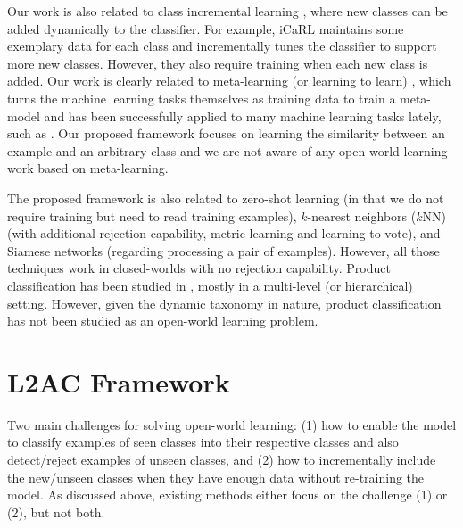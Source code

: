 Our work is also related to class incremental learning \cite{rebuffi2017icarl,rusu2016progressive,lee2017lifelong}, where new classes can be added dynamically to the classifier. For example, 
iCaRL \cite{rebuffi2017icarl} maintains some exemplary data for each class and incrementally tunes the classifier to support more new classes. However, they also require training when each new class is added. 
Our work is clearly related to meta-learning (or learning to learn) \cite{thrun2012learning}, 
which turns the machine learning tasks themselves as training data to train a meta-model and has been successfully applied to many machine learning tasks lately, such as 
\cite{andrychowicz2016learning,fernando2017pathnet,finn2017model,finn2018probabilistic,fan2018learning}.
Our proposed framework focuses on learning the similarity between an example and an arbitrary class
and we are not aware of any open-world learning work based on meta-learning. 

The proposed framework is also related to zero-shot learning \cite{lampert2009learning,palatucci2009zero,socher2013zero} (in that we do not require training but need to read training examples), 
$k$-nearest neighbors ($k$NN) (with additional rejection capability, metric learning \cite{xing2003distance} and learning to vote), 
and Siamese networks \cite{bromley1994signature,koch2015siamese,vinyals2016matching} (regarding processing a pair of examples). 
However, all those techniques work in closed-worlds with no rejection capability.
Product classification has been studied in \cite{shen2011item,shen2012large,chen2013cost,gupta2016product,cevahir2016large,kozareva2015everyone}, mostly in a multi-level (or hierarchical) setting. 
However, given the dynamic taxonomy in nature, product classification has not been studied as an open-world learning problem.

\section{L2AC Framework}
Two main challenges for solving open-world learning: (1) how to enable the model to classify examples of seen classes into their respective classes and also detect/reject examples of unseen classes, and (2) how to incrementally include the new/unseen classes when they have enough data without re-training the model.
As discussed above, existing methods either focus on the challenge (1) or (2), but not both.

